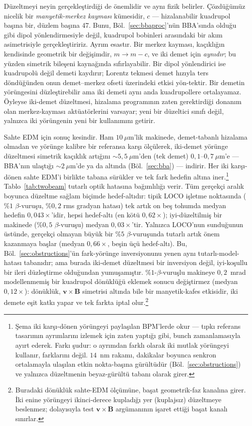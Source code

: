 \documentclass[aps,prab,reprint,superscriptaddress,nofootinbib]{revtex4-2}
\begin{document}
Düzeltmeyi neyin gerçekleştirdiği de önemlidir ve aynı fizik belirler. Çözdüğümüz
nicelik bir \emph{manyetik-merkez kayması} kümesidir, $c$ --- hizalanabilir
kuadrupol başına bir, düzlem başına 47. Bunu, Böl.~\ref{sec:bbaproc}'nün BBA'sında
olduğu gibi dipol yönlendirmesiyle değil, kuadrupol bobinleri arasındaki bir akım
asimetrisiyle gerçekleştiririz. Ayrım esastır. Bir merkez kayması, kaçıklığın
kendisinde geometrik bir değişimdir, $m\to m-c$, ve iki demet için \emph{aynıdır};
bu yüzden simetrik bileşeni kaynağında sıfırlayabilir. Bir dipol yönlendirici ise
kuadrupolü değil demeti kaydırır; Lorentz tekmesi demet hızıyla ters döndüğünden
onun demet--merkez ofseti üzerindeki etkisi yön-tektir. Bir demetin yörüngesini
düzleştirebilir ama iki demeti aynı anda kuadrupollere ortalayamaz. Öyleyse iki-demet
düzeltmesi, hizalama programının zaten gerektirdiği donanım olan merkez-kayması
aktüatörlerini varsayar; yeni bir düzeltici sınıfı değil, yalnızca iki yörüngenin
yeni bir kullanımını getirir.

Sahte EDM için sonuç kesindir. Ham $10~\mu$m'lik makinede, demet-tabanlı hizalama
olmadan ve yörünge kalibre bir referansa karşı ölçülerek, iki-demet yörünge
düzeltmesi simetrik kaçıklık artığını $\sim\!5{,}5~\mu$m'den (tek demet)
$0{,}1$--$0{,}7~\mu$m'e --- BBA'nın ulaştığı $\sim\!2~\mu$m'de ya da altında
(Böl.~\ref{sec:bba}) --- indirir. Her iki karşı-dönen sahte EDM'i birlikte tabana
sürükler ve tek fark hedefin altına iner.\footnote{Şema iki karşı-dönen yörüngeyi
paylaşılan BPM'lerde okur --- tıpkı referans tasarımın ayrımlarını izlemek için zaten
yaptığı gibi, bunch zamanlamasıyla ayırt ederek. Farkı şudur: o ayrımdan farklı
olarak iki mutlak yörüngeyi kullanır, farklarını değil. $14$~nm rakamı, dakikalar
boyunca senkron ortalamayla ulaşılan etkin nokta-başına gürültüdür
(Böl.~\ref{sec:obstructions}) ve yalnızca düzeltmenin beyaz-gürültü tabanı olarak
girer.} Tablo~\ref{tab:twobeam} tutarlı optik hatasına bağımlılığı verir. Tüm
gerçekçi aralık boyunca düzeltme sağlam biçimde hedef-altıdır: tipik LOCO işletme
noktasında ($\%1$ $\beta$-vuruşu, $\%0{,}2$ rms gradyan hatası) tek artık on beş
tohumda medyan hedefin $0{,}043\times$'idir, hepsi hedef-altı (en kötü $0{,}62\times$);
iyi-düzeltilmiş bir makinede ($\%0{,}5$ $\beta$-vuruşu) medyan $0{,}03\times$'tir.
Yalnızca LOCO'nun sunduğunun üstünde, gerçekçi olmayan büyük bir $\%5$ $\beta$-vuruşunda
tutarlı artık önem kazanmaya başlar (medyan $0{,}66\times$, beşin üçü hedef-altı).
Bu, Böl.~\ref{sec:obstructions}'ün fark-yörünge inversiyonunu yenen aynı
tutarlı-model-hatası tabanıdır; ama burada iki-demet düzeltmesi bir inversiyon değil,
iyi-koşullu bir ileri düzleştirme olduğundan yumuşamıştır. $\%1$-$\beta$-vuruşlu
makineye $0{,}2$~mrad modellenmemiş bir kuadrupol dönüklüğü eklemek sonucu değiştirmez
(medyan $0{,}12\times$): dönüklük, $\bm v\times\bm B$ simetrisi altında bile bir
manyetik-kafes etkisidir, iki demete eşit katkı yapar ve tek farkta iptal
olur.\footnote{Buradaki dönüklük sahte-EDM ölçümüne, başat geometrik-faz kanalına
girer. İki enine yörüngeyi ikinci-derece kupladığı yer (kuplajsız) düzeltmeye
beslenmez; dolayısıyla test $\bm v\times\bm B$ argümanının işaret ettiği başat
kanalı sınırlar.}
\end{document}
